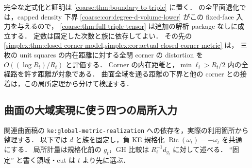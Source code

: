 \documentclass[a4paper,11pt]{ltjsarticle}
\numberwithin{equation}{section}
\theoremstyle{plain}
\theoremstyle{definition}
\theoremstyle{remark}
\newcommand{\Ric}{\operatorname{Ric}}\newcommand{\tr}{\operatorname{tr}}\newcommand{\osc}{\operatorname{osc}}\newcommand{\vol}{\operatorname{Vol}}
\begin{document}
完全な定式化と証明は \cref{coarse:thm:boundary-to-triple} に置く．
 の全平面退化では，capped density 下界
\cref{coarse:cor:degree-d-volume-lower} がこの fixed-face 入力を与えるので，
\cref{coarse:thm:full-triple-tensor} は追加の解析 package なしに成立する．
定数は固定した次数と族に依存してよい．
その先の \cref{simplex:thm:closed-corner-model,simplex:cor:actual-closed-corner-metric} は，
三枚の unit squares の内在距離に対する全閉 corner の distortion を
$O((\log R_t)/R_t)$ と評価する．
Corner の内在距離と，$\min\ell_i>R_t/2$ 内の全経路を許す距離が対象である．
曲面全域を通る距離の下界と他の corner との接着は，この局所定理から分けて検証する．

\subsection{曲面の大域実現に使う四つの局所入力}
\label{sec:surface-minimal-inputs}

関連曲面稿\cite{LagrangianCurrent}の
\texttt{ke:global-metric-realization} への依存を，実際の利用箇所から整理する．
以下では $d$ と族を固定し，負 KE 規格化 $\Ric(\omega_t)=-\omega_t$ を共通にする．
局所計量は規格化前の $g_t$，GH 比較は $R_t^{-1}d_{g_t}$ に対して述べる．
``固定'' と書く領域・cut は $t$ より先に選ぶ．
\end{document}
